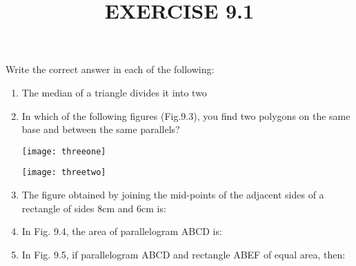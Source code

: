 \documentclass{article}
\title{\color{cyan}EXERCISE 9.1}
\begin{document}
\maketitle
\vspace{-5truemm}
Write the correct answer in each of the following:
\begin{enumerate}
\item The median of a triangle divides it into two 
\begin{enumerate}
\end{enumerate}
\item In which of the following figures (Fig.9.3), you find two polygons on the same base and between the same parallels?

\texttt{[image: threeone]}


\texttt{[image: threetwo]}

\item The figure obtained by joining the mid-points of the adjacent sides of a rectangle of sides 8cm and 6cm is:
\begin{enumerate}
\end{enumerate}

\item In Fig. 9.4, the area of parallelogram ABCD is:
\item In Fig. 9.5, if parallelogram ABCD and rectangle ABEF of equal area, then:


\end{enumerate}
\end{document}
